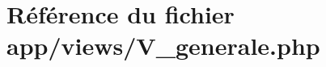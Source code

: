 \hypertarget{_v__generale_8php}{}\section{Référence du fichier app/views/\+V\+\_\+generale.php}
\label{_v__generale_8php}
